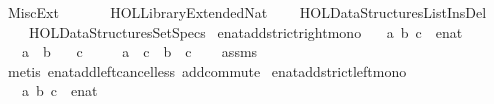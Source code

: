 %
\begin{isabellebody}%
%
%
\isadeliminvisible
%
\endisadeliminvisible
%
\isataginvisible
{}\isamarkupfalse%
\ Misc{\isacharunderscore}{\kern0pt}Ext\isanewline
\ \ \isanewline
\ \ \ \ {\isachardoublequoteopen}HOL{\isacharminus}{\kern0pt}Library{\isachardot}{\kern0pt}Extended{\isacharunderscore}{\kern0pt}Nat{\isachardoublequoteclose}\isanewline
\ \ \ \ {\isachardoublequoteopen}HOL{\isacharminus}{\kern0pt}Data{\isacharunderscore}{\kern0pt}Structures{\isachardot}{\kern0pt}List{\isacharunderscore}{\kern0pt}Ins{\isacharunderscore}{\kern0pt}Del{\isachardoublequoteclose}\isanewline
\ \ \ \ {\isachardoublequoteopen}HOL{\isacharminus}{\kern0pt}Data{\isacharunderscore}{\kern0pt}Structures{\isachardot}{\kern0pt}Set{\isacharunderscore}{\kern0pt}Specs{\isachardoublequoteclose}\isanewline
{}%
\isamarkuptrue%
\isamarkupfalse%
\ enat{\isacharunderscore}{\kern0pt}add{\isacharunderscore}{\kern0pt}strict{\isacharunderscore}{\kern0pt}right{\isacharunderscore}{\kern0pt}mono{\isacharcolon}{\kern0pt}\isanewline
\ \ \ a\ b\ c\ {\isacharcolon}{\kern0pt}{\isacharcolon}{\kern0pt}\ enat\isanewline
\ \ \ {\isachardoublequoteopen}a\ {\isacharless}{\kern0pt}\ b{\isachardoublequoteclose}\isanewline
\ \ \ {\isachardoublequoteopen}c\ {\isasymnoteq}\ {\isasyminfinity}{\isachardoublequoteclose}\isanewline
\ \ \ {\isachardoublequoteopen}a\ {\isacharplus}{\kern0pt}\ c\ {\isacharless}{\kern0pt}\ b\ {\isacharplus}{\kern0pt}\ c{\isachardoublequoteclose}%
\endisataginvisible
{\isafoldinvisible}%
%
\isadeliminvisible
\isanewline
%
\endisadeliminvisible
%
\isadelimproof
\ \ %
\endisadelimproof
%
\isatagproof
{}\isamarkupfalse%
\ assms\isanewline
\ \ \isamarkupfalse%
\ {\isacharparenleft}{\kern0pt}metis\ enat{\isacharunderscore}{\kern0pt}add{\isacharunderscore}{\kern0pt}left{\isacharunderscore}{\kern0pt}cancel{\isacharunderscore}{\kern0pt}less\ add{\isachardot}{\kern0pt}commute{\isacharparenright}{\kern0pt}%
\endisatagproof
{\isafoldproof}%
%
\isadelimproof
\isanewline
%
\endisadelimproof
%
\isadeliminvisible
\isanewline
%
\endisadeliminvisible
%
\isataginvisible
{}\isamarkupfalse%
\ enat{\isacharunderscore}{\kern0pt}add{\isacharunderscore}{\kern0pt}strict{\isacharunderscore}{\kern0pt}left{\isacharunderscore}{\kern0pt}mono{\isacharcolon}{\kern0pt}\isanewline
\ \ \ a\ b\ c\ {\isacharcolon}{\kern0pt}{\isacharcolon}{\kern0pt}\ enat\isanewline

\end{isabellebody}
